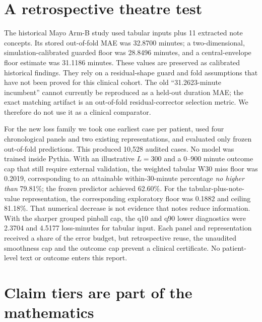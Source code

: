 \documentclass[11pt,a4paper]{article}
\newcommand{\claim}[1]{\textsf{#1}}
\begin{document}
\section{A retrospective theatre test}

The historical Mayo Arm-B study used tabular inputs plus 11 extracted note concepts. Its stored out-of-fold MAE was 32.8700 minutes; a two-dimensional, simulation-calibrated guarded floor was 28.8496 minutes, and a central-envelope floor estimate was 31.1186 minutes. These values are preserved as \claim{calibrated} historical findings. They rely on a residual-shape guard and fold assumptions that have not been proved for this clinical cohort. The old ``31.2623-minute incumbent'' cannot currently be reproduced as a held-out duration MAE; the exact matching artifact is an out-of-fold residual-corrector selection metric. We therefore do not use it as a clinical comparator.

For the new loss family we took one earliest case per patient, used four chronological panels and two existing representations, and evaluated only frozen out-of-fold predictions. This produced 10,528 audited cases. No model was trained inside Pythia. With an illustrative $L=300$ and a 0--900 minute outcome cap that still require external validation, the weighted tabular W30 miss floor was 0.2019, corresponding to an attainable within-30-minute percentage \emph{no higher than} 79.81\%; the frozen predictor achieved 62.60\%. For the tabular-plus-note-value representation, the corresponding exploratory floor was 0.1882 and ceiling 81.18\%. That numerical decrease is not evidence that notes reduce information. With the sharper grouped pinball cap, the q10 and q90 lower diagnostics were 2.3704 and 4.5177 loss-minutes for tabular input. Each panel and representation received a share of the error budget, but retrospective reuse, the unaudited smoothness cap and the outcome cap prevent a clinical certificate. No patient-level text or outcome enters this report.

\section{Claim tiers are part of the mathematics}
\end{document}
